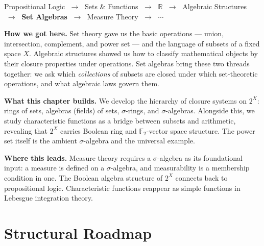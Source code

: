 \begin{tcolorbox}[
  colback=gray!6,
  colframe=gray!40,
  arc=2pt,
  left=8pt, right=8pt, top=6pt, bottom=6pt,
  title={\small\textbf{Where You Are in the Journey}},
  fonttitle=\small\bfseries
]
\begin{center}
\small
Propositional Logic
$\;\to\;$ Sets \& Functions
$\;\to\;$ $\mathbb{R}$
$\;\to\;$ Algebraic Structures
$\;\to\;$ \textbf{Set Algebras}
$\;\to\;$ Measure Theory
$\;\to\;$ $\cdots$
\end{center}

\medskip
\noindent\textbf{How we got here.}
Set theory gave us the basic operations --- union, intersection, complement,
and power set --- and the language of subsets of a fixed space $X$.
Algebraic structures showed us how to classify mathematical objects by
their closure properties under operations. Set algebras bring these two
threads together: we ask which \emph{collections} of subsets are closed
under which set-theoretic operations, and what algebraic laws govern them.

\medskip
\noindent\textbf{What this chapter builds.}
We develop the hierarchy of closure systems on $2^X$: rings of sets,
algebras (fields) of sets, $\sigma$-rings, and $\sigma$-algebras.
Alongside this, we study characteristic functions as a bridge between
subsets and arithmetic, revealing that $2^X$ carries Boolean ring and
$\mathbb{F}_2$-vector space structure. The power set itself is the
ambient $\sigma$-algebra and the universal example.

\medskip
\noindent\textbf{Where this leads.}
Measure theory requires a $\sigma$-algebra as its foundational input:
a measure is defined on a $\sigma$-algebra, and measurability is a
membership condition in one. The Boolean algebra structure of $2^X$
connects back to propositional logic. Characteristic functions
reappear as simple functions in Lebesgue integration theory.
\end{tcolorbox}
\vspace{1em}

\section*{Structural Roadmap}

